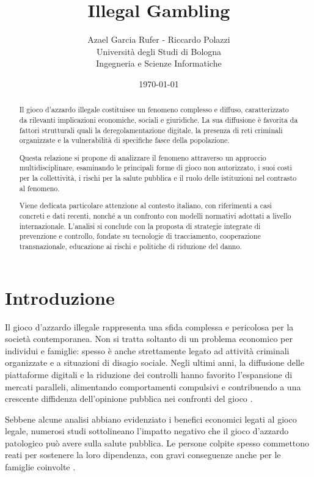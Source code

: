 \documentclass[a4paper,12pt]{article}
\title{\textbf{Illegal Gambling}}
\author{Azael Garcia Rufer - Riccardo Polazzi \\ Università degli Studi di Bologna \\ Ingegneria e Scienze Informatiche}
\date{\today}
\begin{document}
\maketitle

\begin{abstract}
    Il gioco d’azzardo illegale costituisce un fenomeno complesso e diffuso, caratterizzato da rilevanti implicazioni economiche, sociali e giuridiche. La sua diffusione è favorita da fattori strutturali quali la deregolamentazione digitale, la presenza di reti criminali organizzate e la vulnerabilità di specifiche fasce della popolazione.

    Questa relazione si propone di analizzare il fenomeno attraverso un approccio multidisciplinare, esaminando le principali forme di gioco non autorizzato, i suoi costi per la collettività, i rischi per la salute pubblica e il ruolo delle istituzioni nel contrasto al fenomeno.
    
    Viene dedicata particolare attenzione al contesto italiano, con riferimenti a casi concreti e dati recenti, nonché a un confronto con modelli normativi adottati a livello internazionale. L’analisi si conclude con la proposta di strategie integrate di prevenzione e controllo, fondate su tecnologie di tracciamento, cooperazione transnazionale, educazione ai rischi e politiche di riduzione del danno.
\end{abstract}

\newpage
\tableofcontents
\newpage
\section{Introduzione}

Il gioco d’azzardo illegale rappresenta una sfida complessa e pericolosa per la società contemporanea. Non si tratta soltanto di un problema economico per individui e famiglie: spesso è anche strettamente legato ad attività criminali organizzate e a situazioni di disagio sociale. Negli ultimi anni, la diffusione delle piattaforme digitali e la riduzione dei controlli hanno favorito l’espansione di mercati paralleli, alimentando comportamenti compulsivi e contribuendo a una crescente diffidenza dell’opinione pubblica nei confronti del gioco \cite{banks2018taxonomy}.

Sebbene alcune analisi abbiano evidenziato i benefici economici legati al gioco legale, numerosi studi sottolineano l’impatto negativo che il gioco d’azzardo patologico può avere sulla salute pubblica. Le persone colpite spesso commettono reati per sostenere la loro dipendenza, con gravi conseguenze anche per le famiglie coinvolte \cite{gorsane2017illegalacts, lucchini2022socialcosts}.
\end{document}
